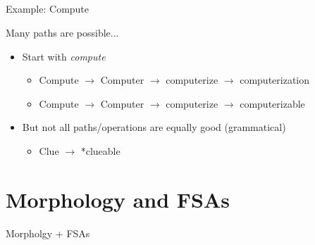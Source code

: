 \documentclass[9pt,xcolor=pdftex,dvipsnames,table]{beamer}
\begin{document}
\subsection{}
\begin{frame}{Example: Compute}

{\large Many paths are possible...}
\vspace{.5cm}

	\begin{itemize}
		\item Start with \emph{compute}
		\begin{itemize}
			\item Compute $\rightarrow$ Computer $\rightarrow$ computerize $\rightarrow$ computerization \pause
			\item Compute $\rightarrow$ Computer $\rightarrow$ computerize $\rightarrow$ computerizable \pause
		\end{itemize}
		\vspace{.5cm}
		\item But not all paths/operations are equally good (grammatical) \pause
		\begin{itemize}
			\item Clue $\rightarrow$ *clueable
		\end{itemize}
	\end{itemize}
\end{frame}

\section{Morphology and FSAs}
\begin{frame}{Morpholgy + FSAs}
\begin{center}
\end{center}
\end{frame}
\end{document}
